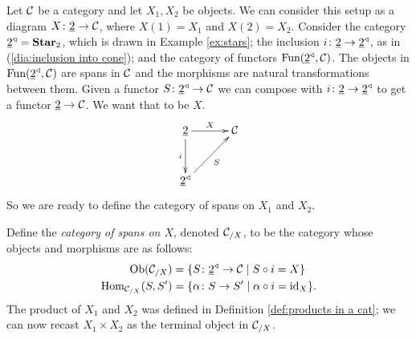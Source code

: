\begin{construction}[Products]

Let $\mathcal{C}$ be a category and let $X_1,X_2$ be objects. We can consider this setup as a diagram $X\colon\underline{2}\rightarrow\mathcal{C}$, where $X(1)=X_1$ and $X(2)=X_2$. Consider the category $\underline{2}^\triangleleft={\bf Star}_2$, which is drawn in Example \ref{ex:stars}; the inclusion $i\colon\underline{2}\rightarrow\underline{2}^\triangleleft$, as in (\ref{dia:inclusion into cone}); and the category of functors $\textnormal{Fun}(\underline{2}^\triangleleft,\mathcal{C})$. The objects in $\textnormal{Fun}(\underline{2}^\triangleleft,\mathcal{C})$ are spans in $\mathcal{C}$ and the morphisms are natural transformations between them. Given a functor $S\colon\underline{2}^\triangleleft\rightarrow\mathcal{C}$ we can compose with $i\colon\underline{2}\rightarrow\underline{2}^\triangleleft$ to get a functor $\underline{2}\rightarrow\mathcal{C}$. We want that to be $X$.
$$\xymatrix@=30pt{\ul{2}\ar[r]^{X}\ar[d]_i&\mcC\\\ul{2}\lcone\ar[ur]_S}$$
So we are ready to define the category of spans on $X_1$ and $X_2$.

Define the {\em category of spans on $X$}, denoted $\mathcal{C}_{/X}$, to be the category whose objects and morphisms are as follows:
\begin{align}\label{dia:slice for products}
\textnormal{Ob}(\mathcal{C}_{/X})&=\{S\colon\underline{2}^\triangleleft\rightarrow\mathcal{C}{\;|\;}S\circ i=X\}\\
\nonumber\textnormal{Hom}_{\mathcal{C}_{/X}}(S,S')&=\{\alpha\colon S\rightarrow S'{\;|\;}\alpha\circ i=\textnormal{id}_X\}.
\end{align}
The product of $X_1$ and $X_2$ was defined in Definition \ref{def:products in a cat}; we can now recast $X_1\times X_2$ as the terminal object in $\mathcal{C}_{/X}$.


\end{construction}

